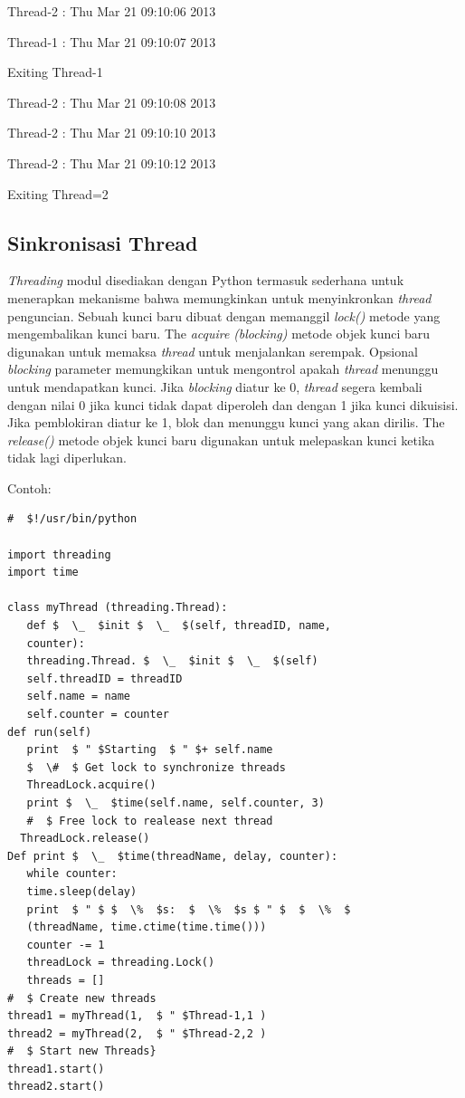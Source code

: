 \begin{itemize}
{\fontsize{10pt}{10pt}\selectfont Thread-2 : Thu Mar 21 09:10:06 2013} 
 
{\fontsize{10pt}{10pt}\selectfont Thread-1 : Thu Mar 21 09:10:07 2013} 
 
{\fontsize{10pt}{10pt}\selectfont Exiting Thread-1} 
 
{\fontsize{10pt}{10pt}\selectfont Thread-2 : Thu Mar 21 09:10:08 2013} 
 
{\fontsize{10pt}{10pt}\selectfont Thread-2 : Thu Mar 21 09:10:10 2013} 
 
{\fontsize{10pt}{10pt}\selectfont Thread-2 : Thu Mar 21 09:10:12 2013} 
 
{\fontsize{10pt}{10pt}\selectfont Exiting Thread=2} 

\vspace{10pt}
\subsection{Sinkronisasi Thread}
\hspace*{0.5in} \textit{T}\textit{hread}\textit{ing }modul disediakan dengan Python termasuk sederhana untuk menerapkan mekanisme bahwa memungkinkan untuk menyinkronkan \textit{thread}\textit{ }penguncian. Sebuah kunci baru dibuat dengan memanggil \textit{lock() }metode yang mengembalikan kunci baru. 
The \textit{acquire}\textit{ }\textit{(blocking)}\textit{ }metode objek kunci baru digunakan untuk memaksa \textit{thread}\textit{ }untuk menjalankan serempak. Opsional \textit{blocking} parameter memungkikan untuk mengontrol apakah\textit{ thread} menunggu untuk mendapatkan kunci. 
Jika \textit{blocking} diatur ke 0, \textit{thread} segera kembali dengan nilai 0 jika kunci tidak dapat diperoleh dan dengan 1 jika kunci dikuisisi. Jika pemblokiran diatur ke 1, blok dan menunggu kunci yang akan dirilis. 
The \textit{release()} metode objek kunci baru digunakan untuk melepaskan kunci ketika tidak lagi diperlukan.  
 
\vspace{12pt}
Contoh: 

\begin{verbatim}
#  $!/usr/bin/python
 
import threading
import time

class myThread (threading.Thread): 
   def $  \_  $init $  \_  $(self, threadID, name, 
   counter):
   threading.Thread. $  \_  $init $  \_  $(self)
   self.threadID = threadID
   self.name = name
   self.counter = counter
def run(self) 
   print  $ " $Starting  $ " $+ self.name 
   $  \#  $ Get lock to synchronize threads 
   ThreadLock.acquire() 
   print $  \_  $time(self.name, self.counter, 3) 
   #  $ Free lock to realease next thread
  ThreadLock.release()
Def print $  \_  $time(threadName, delay, counter):
   while counter:
   time.sleep(delay)
   print  $ " $ $  \%  $s:  $  \%  $s $ " $  $  \%  $ 
   (threadName, time.ctime(time.time()))
   counter -= 1
   threadLock = threading.Lock() 
   threads = []
#  $ Create new threads
thread1 = myThread(1,  $ " $Thread-1,1 ) 
thread2 = myThread(2,  $ " $Thread-2,2 )
#  $ Start new Threads} 
thread1.start() 
thread2.start()
 

\end{verbatim}
\end{itemize}
